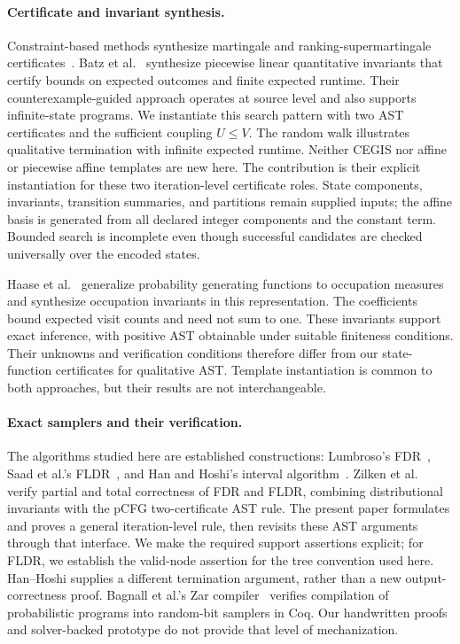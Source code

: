 \paragraph{Certificate and invariant synthesis.}
Constraint-based methods synthesize martingale and ranking-supermartingale
certificates~\cite{ChakarovSankaranarayanan2013}. Batz et
al.~\cite{BatzEtAl2023} synthesize piecewise linear quantitative invariants
that certify bounds on expected outcomes and finite expected runtime.
Their counterexample-guided approach operates at source level and also
supports infinite-state programs.
We instantiate this search pattern with two AST certificates and the
sufficient coupling $U\leq V$. The random
walk illustrates qualitative termination with infinite expected runtime.
Neither CEGIS nor affine or piecewise affine templates are new here.
The contribution is their explicit instantiation for these two
iteration-level certificate roles. State components, invariants, transition summaries, and partitions
remain supplied inputs; the affine basis is generated from all declared
integer components and the constant term. Bounded search is incomplete
even though successful candidates are checked universally over the
encoded states.

Haase et al.~\cite{haase2026generatingfunctionsmeetoccupation} generalize
probability generating functions to occupation measures and synthesize
occupation invariants in this representation. The coefficients bound
expected visit counts and need not sum to one.
These invariants support exact inference,
with positive AST obtainable under suitable finiteness conditions.
Their unknowns and verification conditions therefore differ from our
state-function certificates for qualitative AST. Template instantiation
is common to both approaches, but their results are not interchangeable.

\paragraph{Exact samplers and their verification.}
The algorithms studied here are established constructions:
Lumbroso's FDR~\cite{DBLP:journals/corr/abs-1304-1916}, Saad et al.'s
FLDR~\cite{DBLP:conf/aistats/SaadFRM20}, and Han and Hoshi's interval
algorithm~\cite{HanHoshi1997}. Zilken et
al.~\cite{zilken2026verifyingsamplingalgorithmsdistributional}
verify partial and total correctness of FDR and FLDR, combining
distributional invariants with the pCFG two-certificate AST rule.
The present paper formulates and proves a general iteration-level rule,
then revisits these AST arguments through that interface. We make the
required support assertions explicit; for FLDR, we establish the
valid-node assertion for the tree convention used here.
Han--Hoshi supplies a different termination argument, rather than
a new output-correctness proof.
Bagnall et al.'s Zar compiler~\cite{DBLP:journals/pacmpl/Bagnall0023}
verifies compilation of probabilistic programs into random-bit samplers
in Coq. Our handwritten proofs and solver-backed prototype do not
provide that level of mechanization.

